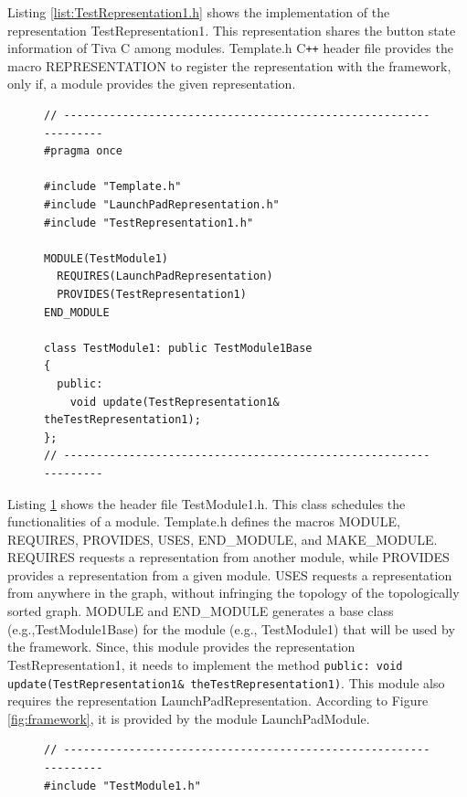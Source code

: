 \documentclass{llncs}
\begin{document}
\begin{sloppy}
Listing \ref{list:TestRepresentation1.h} shows the implementation of the representation {\sf
TestRepresentation1}. This representation shares the button state information of Tiva C among
modules. {\sf Template.h} C\texttt{++} header file provides the macro {\sf REPRESENTATION} to
register the representation with the framework, only if, a module provides the given
representation. 

\begin{figure}[!ht]
\begin{center}
\begin{verbatim}
// -----------------------------------------------------------------
#pragma once

#include "Template.h"
#include "LaunchPadRepresentation.h"
#include "TestRepresentation1.h"

MODULE(TestModule1)
  REQUIRES(LaunchPadRepresentation)
  PROVIDES(TestRepresentation1)
END_MODULE

class TestModule1: public TestModule1Base
{
  public:
    void update(TestRepresentation1& theTestRepresentation1);
}; 
// -----------------------------------------------------------------
\end{verbatim}
\end{center}
\label{list:TestModule1.h}
\end{figure}

Listing \ref{list:TestModule1.h} shows the header file {\sf TestModule1.h}. This class schedules
the functionalities of a module. {\sf Template.h} defines the macros {\sf MODULE}, {\sf REQUIRES},
{\sf PROVIDES}, {\sf USES}, {\sf END\_MODULE}, and {\sf MAKE\_MODULE}.  {\sf REQUIRES} requests a
representation from another module, while {\sf PROVIDES} provides a representation from a given
module. {\sf USES} requests a representation from anywhere in the graph, without infringing the
topology of the topologically sorted graph. {\sf MODULE} and {\sf END\_MODULE} generates a base
class (e.g.,{\sf TestModule1Base}) for the module (e.g., {\sf TestModule1}) that will be used by the
framework. Since, this module provides the representation {\sf TestRepresentation1}, it needs to
implement the method \texttt{public: void update(TestRepresentation1&
theTestRepresentation1)}. This module also requires the representation {\sf
LaunchPadRepresentation}. According to Figure \ref{fig:framework}, it is provided by the module
{\sf LaunchPadModule}. 


\begin{figure}[!ht]
\begin{center}
\begin{verbatim}
// -----------------------------------------------------------------
#include "TestModule1.h"


\end{verbatim}
\end{center}
\end{figure}
\end{sloppy}
\end{document}
